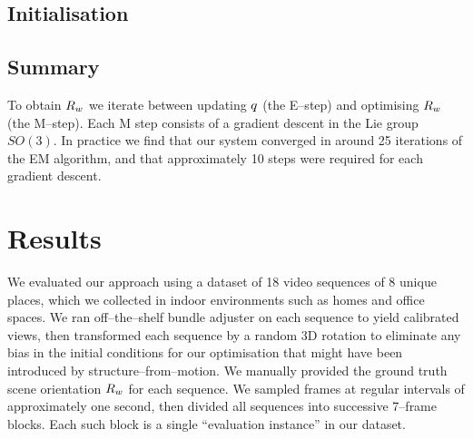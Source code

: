 \subsection{Initialisation}


\subsection{Summary}
To obtain $\SceneR$ we iterate between updating $\PosteriorEst$ (the
E--step) and optimising $\SceneR$ (the M--step). Each M step consists
of a gradient descent in the Lie group $SO(3)$. In practice we find
that our system converged in around 25 iterations of the EM algorithm,
and that approximately 10 steps were required for each gradient
descent.

\section{Results}

We evaluated our approach using a dataset of 18 video sequences of 8
unique places, which we collected in indoor environments such as homes
and office spaces. We ran  off--the--shelf bundle
adjuster on each sequence to yield calibrated views, then transformed
each sequence by a random 3D rotation to eliminate any bias in the
initial conditions for our optimisation that might have been
introduced by structure--from--motion. We manually provided the ground
truth scene orientation $\SceneR$ for each sequence. We sampled frames
at regular intervals of approximately one second, then divided all
sequences into successive 7--frame blocks. Each such block is a single
``evaluation instance'' in our dataset.


